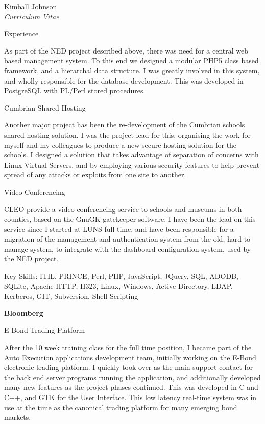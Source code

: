 \documentclass[10pt]{article}
\newenvironment{subbulletlist}{%
	\begin{list}{\labelitemii}{%
		\setlength{\topsep}{\itemsep}\setlength{\parskip}{\parsep}%
	}%
}%
{ \end{list} }
\begin{document}
\begin{cv}{Kimball Johnson\\{\large \itshape Curriculum Vitae}}
\begin{cvlist}{Experience}
\begin{subbulletlist}
		As part of the NED project described above, there was need for a central 
		web based management system.  To this end we designed a modular PHP5 class 
		based framework, and a hierarchal data structure. I was greatly involved 
		in this system, and wholly responsible for the database development. This was 
		developed in PostgreSQL with PL/Perl stored procedures.
    \item Cumbrian Shared Hosting 

        Another major project has been the re-development of the Cumbrian
        schools shared hosting solution.  I was the project lead for this,
        organising the work for myself and my colleagues to produce a new 
        secure hosting solution for the schools.  I designed a 
        solution that takes advantage of separation of concerns with Linux 
        Virtual Servers, and by employing various security features to help
        prevent spread of any attacks or exploits from one site to another.
    \item Video Conferencing 

        CLEO provide a video conferencing service to schools and museums in
        both counties, based on the GnuGK gatekeeper software.  I have
        been the lead on this service since I started at LUNS full time, and
        have been responsible for a migration of the management and
        authentication system from the old, hard to manage system, to integrate
        with the dashboard configuration system, used by the NED project.
	\end{subbulletlist}
	
	Key Skills: ITIL, PRINCE, Perl, PHP, JavaScript, JQuery,  SQL, ADODB, SQLite,
	Apache HTTP, H323, Linux, Windows, Active Directory, LDAP, Kerberos, GIT, 
	Subversion, Shell Scripting
	\item \textbf{Bloomberg}

	\begin{subbulletlist}
    \item E-Bond Trading Platform

    After the 10 week training class for the full time position, I became part of 
    the Auto Execution applications development team, initially working on the 
    E-Bond electronic trading platform. I quickly took over as the main support 
    contact for the back end server programs running the application, and 
    additionally developed many new features as the project phases continued.
    This was developed in C and C++, and GTK for the User Interface.  This low latency 
	real-time system was in use at the time as the canonical trading platform for 
	many emerging bond markets.
    

\end{subbulletlist}
\end{cvlist}
\end{cv}
\end{document}
